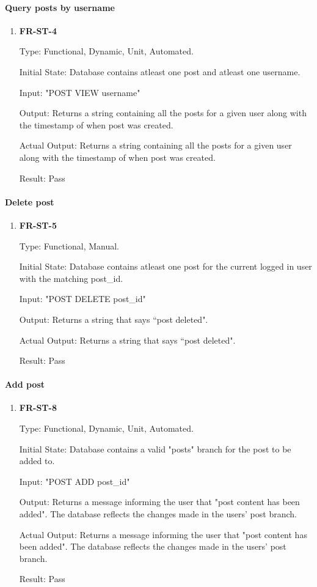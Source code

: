 \documentclass[12pt, titlepage]{article}
\begin{document}
\paragraph{Query posts by username}	
\begin{enumerate}
\item{\textbf{FR-ST-4}}

Type: Functional, Dynamic, Unit, Automated.
					
Initial State: Database contains atleast one post and atleast one username.
					
Input: "POST VIEW username"
					
Output: Returns a string containing all the posts for a given user along with the timestamp of when post was created.


Actual Output: Returns a string containing all the posts for a given user along with the timestamp of when post was created.
					
Result: Pass
\end{enumerate}

\paragraph{Delete post}	
\begin{enumerate}
\item{\textbf{FR-ST-5}}

Type: Functional, Manual.
					
Initial State: Database contains atleast one post for the current logged in user with the matching post\_id.
					
Input: "POST DELETE post\_id"
					
Output: Returns a string that says ``post deleted".


Actual Output: Returns a string that says ``post deleted".
					
Result: Pass
\end{enumerate}

\paragraph{Add post}	
\begin{enumerate}
\item{\textbf{FR-ST-8}}

Type: Functional, Dynamic, Unit, Automated.
					
Initial State: Database contains a valid "posts" branch for the post to be added to.
					
Input: "POST ADD post\_id"
					
Output: Returns a message informing the user that "post content has been added". The database reflects the changes made in the users' post branch.


Actual Output: Returns a message informing the user that "post content has been added". The database reflects the changes made in the users' post branch.
					
Result: Pass
\end{enumerate}
\end{document}
